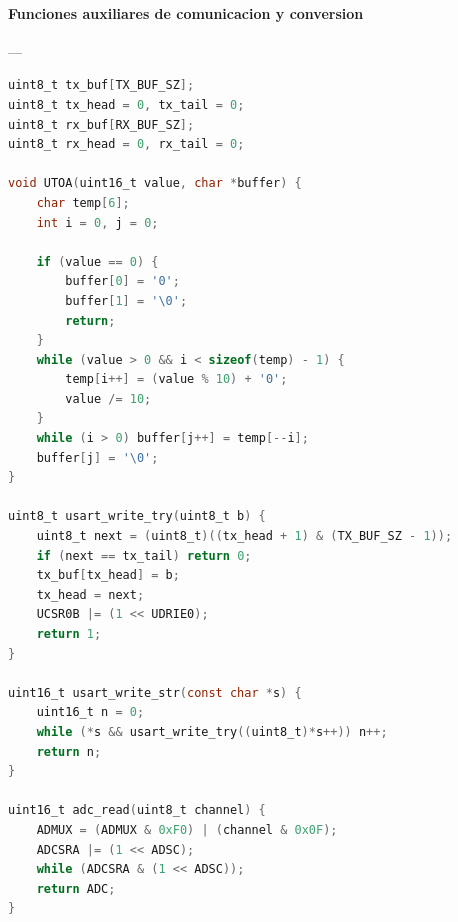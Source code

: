 \paragraph{Funciones auxiliares de comunicacion y conversion}\label{anexo:M2_usart_utils}---\\
\begin{lstlisting}[language=C, caption={Rutinas auxiliares para conversion y manejo de buffers USART.}]
uint8_t tx_buf[TX_BUF_SZ];
uint8_t tx_head = 0, tx_tail = 0;
uint8_t rx_buf[RX_BUF_SZ];
uint8_t rx_head = 0, rx_tail = 0;

void UTOA(uint16_t value, char *buffer) { 
    char temp[6];
    int i = 0, j = 0;

    if (value == 0) {
        buffer[0] = '0';
        buffer[1] = '\0';
        return;
    }
    while (value > 0 && i < sizeof(temp) - 1) {
        temp[i++] = (value % 10) + '0';
        value /= 10;
    }
    while (i > 0) buffer[j++] = temp[--i];
    buffer[j] = '\0';
}

uint8_t usart_write_try(uint8_t b) {
    uint8_t next = (uint8_t)((tx_head + 1) & (TX_BUF_SZ - 1));
    if (next == tx_tail) return 0;
    tx_buf[tx_head] = b;
    tx_head = next;
    UCSR0B |= (1 << UDRIE0);
    return 1;
}

uint16_t usart_write_str(const char *s) {
    uint16_t n = 0;
    while (*s && usart_write_try((uint8_t)*s++)) n++;
    return n;
}

uint16_t adc_read(uint8_t channel) {
    ADMUX = (ADMUX & 0xF0) | (channel & 0x0F);
    ADCSRA |= (1 << ADSC);
    while (ADCSRA & (1 << ADSC));
    return ADC;
}
\end{lstlisting}

